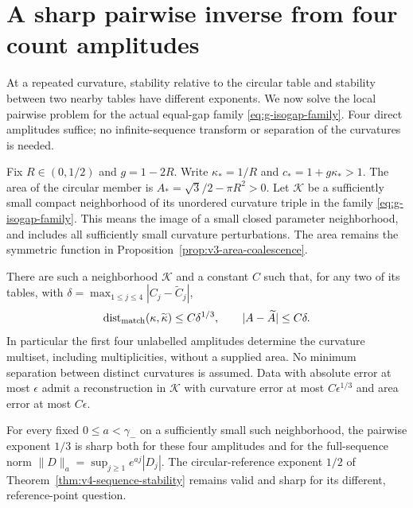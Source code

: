\section{A sharp pairwise inverse from four count amplitudes}
\label{sec:v5-pairwise}
At a repeated curvature, stability relative to the circular table and
stability between two nearby tables have different exponents. We now
solve the local pairwise problem for the actual equal-gap family
\eqref{eq:g-isogap-family}. Four direct amplitudes suffice; no
infinite-sequence transform or separation of the curvatures is needed.

Fix $R\in(0,1/2)$ and $g=1-2R$. Write
$\kappa_* =1/R$ and $c_*=1+g\kappa_*>1$. The area of the circular
member is $A_* =\sqrt3/2-\pi R^2>0$. Let $\mathcal K$ be a
sufficiently small compact neighborhood of its unordered curvature
triple in the family \eqref{eq:g-isogap-family}. This means the image
of a small closed parameter neighborhood, and includes all sufficiently
small curvature perturbations. The area remains the symmetric function
in Proposition~\ref{prop:v3-area-coalescence}.

\begin{theorem}
\label{thm:v5-pairwise}
There are such a neighborhood $\mathcal K$ and a constant $C$ such
that, for any two of its tables, with
$\delta=\max_{1\le j\le4}|C_j-\widetilde C_j|$,
\begin{equation}\label{eq:v5-pairwise-bound}
 \operatorname{dist}_{\rm match}(\kappa,\widetilde\kappa)
       \le C\delta^{1/3},\qquad
 |A-\widetilde A|\le C\delta.
\end{equation}
In particular the first four unlabelled amplitudes determine the
curvature multiset, including multiplicities, without a supplied area.
No minimum separation between distinct curvatures is assumed. Data
with absolute error at most $\epsilon$ admit a reconstruction in
$\mathcal K$ with curvature error at most $C\epsilon^{1/3}$ and area
error at most $C\epsilon$.

For every fixed $0\le a<\gamma_-$ on a sufficiently small such
neighborhood, the pairwise exponent $1/3$ is sharp both for these four
amplitudes and for the full-sequence norm
$\|D\|_a=\sup_{j\ge1}e^{aj}|D_j|$. The circular-reference exponent
$1/2$ of Theorem~\ref{thm:v4-sequence-stability} remains valid and
sharp for its different, reference-point question.
\end{theorem}

